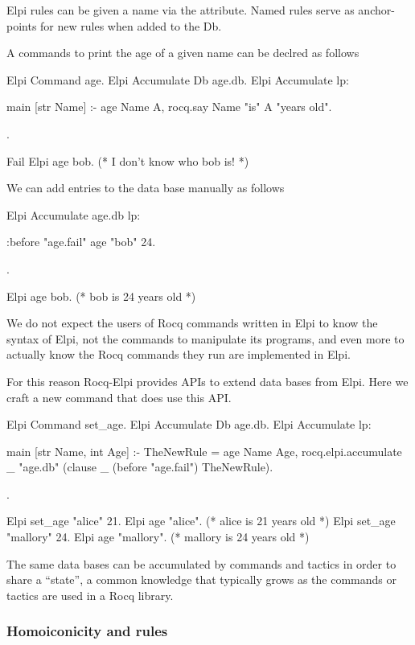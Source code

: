 \documentclass[a4paper, 11pt]{book}
\begin{document}
Elpi rules can be given a name via the  attribute.
Named rules serve as anchor-points for new rules when added to the Db.

A commands to print the age of a given name can be declred as follows

\begin{rocqcode}
Elpi Command age.
Elpi Accumulate Db age.db.
Elpi Accumulate lp:{{

  main [str Name] :-
    age Name A,
    rocq.say Name "is" A "years old".

}}.

Fail Elpi age bob. (* I don't know who bob is! *)
\end{rocqcode}

We can add entries to the data base manually as follows

\begin{rocqcode}
Elpi Accumulate age.db lp:{{

  :before "age.fail"     %
  age "bob" 24.

}}.

Elpi age bob. (* bob is 24 years old *)
\end{rocqcode}

We do not expect the users of Rocq commands written in Elpi to know the
syntax of Elpi, not the commands to manipulate its programs, and even more
to actually know the Rocq commands they run are implemented in Elpi.

For this reason Rocq-Elpi provides APIs to extend data bases from Elpi.
Here we craft a new command  that does use this API.

\begin{rocqcode}
Elpi Command set_age.
Elpi Accumulate Db age.db.
Elpi Accumulate lp:{{

  main [str Name, int Age] :-
    TheNewRule = age Name Age,
    rocq.elpi.accumulate _ "age.db"
      (clause _ (before "age.fail") TheNewRule).

}}.

Elpi set_age "alice" 21.
Elpi age "alice". (* alice is 21 years old *)
Elpi set_age "mallory" 24.
Elpi age "mallory". (* mallory is 24 years old *)
\end{rocqcode}

The same data bases can be accumulated by commands and tactics in order
to share a ``state'', a common knowledge that typically grows as the
commands or tactics are used in a Rocq library.

\subsubsection{Homoiconicity and rules}
\end{document}
